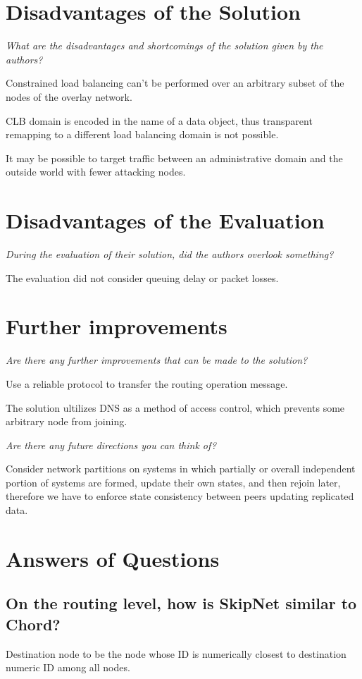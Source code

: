 \documentclass{article}
\begin{document}
 
\section{Disadvantages of the Solution}
{\itshape What are the disadvantages and shortcomings of the solution given by the authors?}

Constrained load balancing can't be performed over an arbitrary subset of the nodes of the overlay network.

CLB domain is encoded in the name of a data object, thus transparent remapping to a different load balancing domain is not possible.

It may be possible to target traffic between an administrative domain and the outside world with fewer attacking nodes.


\section{Disadvantages of the Evaluation}
{\itshape During the evaluation of their solution, did the authors overlook something?}

The evaluation did not consider queuing delay or packet losses. 
\section{Further improvements}
{\itshape Are there any further improvements that can be made to the solution?}

Use a reliable protocol to transfer the routing operation message.

The solution ultilizes DNS as a method of access control, which prevents some arbitrary node from joining.

{\itshape Are there any future directions you can think of?}

Consider network partitions on systems in which partially or overall independent portion of systems are formed, update their own states, and then rejoin later, therefore we have to enforce state consistency between peers updating replicated data.


\section{Answers of Questions}
\subsection{On the routing level, how is SkipNet similar to Chord?}
Destination node to be the node whose ID is numerically closest to destination numeric ID among all nodes.
\end{document}
